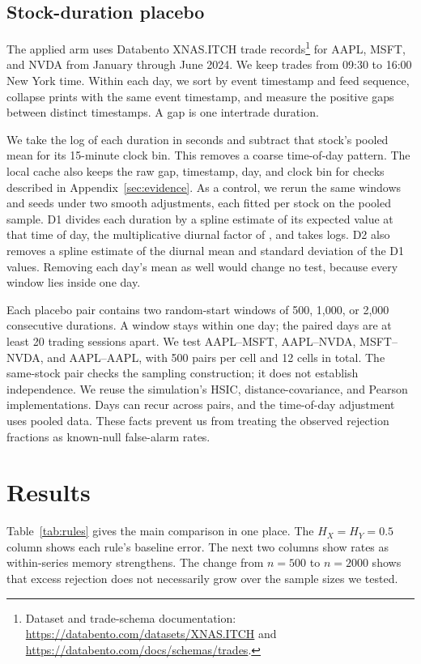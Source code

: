 \documentclass[11pt]{article}
\theoremstyle{remark}
\begin{document}
\subsection{Stock-duration placebo}
The applied arm uses Databento XNAS.ITCH trade records\footnote{Dataset and trade-schema documentation: \url{https://databento.com/datasets/XNAS.ITCH} and \url{https://databento.com/docs/schemas/trades}.} for AAPL, MSFT, and NVDA from January through June 2024. We keep trades from 09:30 to 16:00 New York time. Within each day, we sort by event timestamp and feed sequence, collapse prints with the same event timestamp, and measure the positive gaps between distinct timestamps. A gap is one intertrade duration.

We take the log of each duration in seconds and subtract that stock's pooled mean for its 15-minute clock bin. This removes a coarse time-of-day pattern. The local cache also keeps the raw gap, timestamp, day, and clock bin for checks described in Appendix~\ref{sec:evidence}. As a control, we rerun the same windows and seeds under two smooth adjustments, each fitted per stock on the pooled sample. D1 divides each duration by a spline estimate of its expected value at that time of day, the multiplicative diurnal factor of \citet{engle1998acd}, and takes logs. D2 also removes a spline estimate of the diurnal mean and standard deviation of the D1 values. Removing each day's mean as well would change no test, because every window lies inside one day.

Each placebo pair contains two random-start windows of 500, 1,000, or 2,000 consecutive durations. A window stays within one day; the paired days are at least 20 trading sessions apart. We test AAPL--MSFT, AAPL--NVDA, MSFT--NVDA, and AAPL--AAPL, with 500 pairs per cell and 12 cells in total. The same-stock pair checks the sampling construction; it does not establish independence. We reuse the simulation's HSIC, distance-covariance, and Pearson implementations. Days can recur across pairs, and the time-of-day adjustment uses pooled data. These facts prevent us from treating the observed rejection fractions as known-null false-alarm rates.

\section{Results}\label{sec:results}
Table~\ref{tab:rules} gives the main comparison in one place. The $H_X=H_Y=0.5$ column shows each rule's baseline error. The next two columns show rates as within-series memory strengthens. The change from $n=500$ to $n=2000$ shows that excess rejection does not necessarily grow over the sample sizes we tested.
\end{document}
